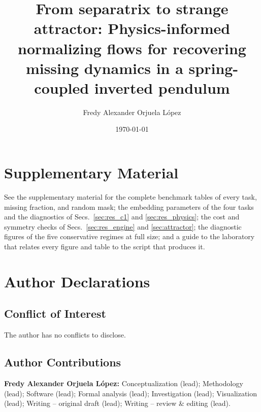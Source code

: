 \documentclass[%
 aip,
 cha,
 amsmath,amssymb,
 reprint,%
 longbibliography,%
]{revtex4-1}
\begin{document}

\title[From separatrix to strange attractor]{From separatrix to strange attractor: Physics-informed normalizing flows for recovering missing dynamics in a spring-coupled inverted pendulum}

\author{Fredy Alexander Orjuela L\'opez}

\date{\today}



\maketitle













\section*{Supplementary Material}
See the supplementary material for the complete benchmark tables of every task, missing fraction, and random mask; the embedding parameters of the four tasks and the diagnostics of Secs.~\ref{sec:res_c1} and \ref{sec:res_physics}; the cost and symmetry checks of Secs.~\ref{sec:res_engine} and \ref{sec:attractor}; the diagnostic figures of the five conservative regimes at full size; and a guide to the laboratory that relates every figure and table to the script that produces it.

\begin{acknowledgments}

\end{acknowledgments}

\section*{Author Declarations}
\subsection*{Conflict of Interest}
The author has no conflicts to disclose.

\subsection*{Author Contributions}
\textbf{Fredy Alexander Orjuela L\'opez:} Conceptualization (lead); Methodology (lead); Software (lead); Formal analysis (lead); Investigation (lead); Visualization (lead); Writing -- original draft (lead); Writing -- review \& editing (lead).
\end{document}
